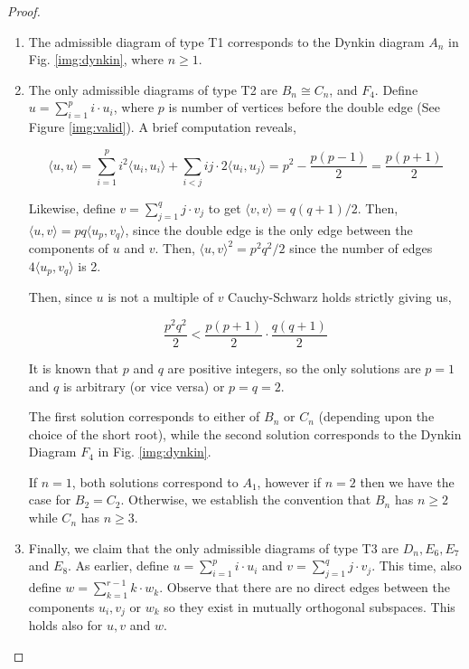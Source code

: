 \begin{proof}
\begin{enumerate}
        \item The admissible diagram of type T1 corresponds to the Dynkin diagram $A_n$ in Fig. \ref{img:dynkin}, where $n \geq 1$.

        \item The only admissible diagrams of type T2 are $B_n \cong C_n$, and $F_4$. Define $u = \sum_{i=1}^{p} i \cdot u_i$, where $p$ is
        number of vertices before the double edge (See Figure \ref{img:valid}). A brief computation reveals,
        
        \begin{equation}
            \label{eq:self_inp}
            \langle u, u \rangle = \sum_{i=1}^p i^2 \langle u_i, u_i \rangle + \sum_{i < j} ij \cdot 2 \langle u_i, u_j \rangle
                = p^2 - \frac{p(p-1)}{2} = \frac{p(p+1)}{2}
        \end{equation}
    
        Likewise, define $v = \sum_{j=1}^q j \cdot v_j$ to get $\langle v, v \rangle = q(q+1)/2$.
        Then, $\langle u, v \rangle = pq \langle u_p , v_q \rangle$, since the double edge is the only edge between the components of
        $u$ and $v$. Then, $\langle u, v \rangle^2 = p^2q^2 / 2$ since the number of edges $4 \langle u_p, v_q \rangle$ is 2.

        Then, since $u$ is not a multiple of $v$ Cauchy-Schwarz holds strictly giving us,

        \begin{equation*}
            \frac{p^2q^2}{2} < \frac{p(p+1)}{2} \cdot \frac{q(q+1)}{2}
        \end{equation*}

        It is known that $p$ and $q$ are positive integers, so the only solutions are $p=1$ and $q$ is
        arbitrary (or vice versa) or $p = q = 2$. \newline

        The first solution corresponds to either of $B_n$ or $C_n$ (depending upon the choice of the short root), while the
        second solution corresponds to the Dynkin Diagram $F_4$ in Fig. \ref{img:dynkin}. \newline

        If $n=1$, both solutions correspond to $A_1$, however if $n=2$ then we have the case  for $B_2 = C_2$. Otherwise,
        we establish the convention that $B_n$ has $n \geq 2$ while $C_n$ has $n\geq 3$.

        
        \item Finally, we claim that the only admissible diagrams of type T3 are $D_n, E_6, E_7$ and $E_8$.
        As earlier, define $u = \sum_{i=1}^p i \cdot u_i$ and $v = \sum_{j=1}^q j \cdot v_j$. This time, also
        define $w = \sum_{k=1}^{r-1} k \cdot w_k$. Observe that there are no direct edges between the components 
        $u_i, v_j$ or $w_k$ so they exist in mutually orthogonal subspaces. This holds also for $u, v$ and $w$. \newline


\end{enumerate}
\end{proof}
